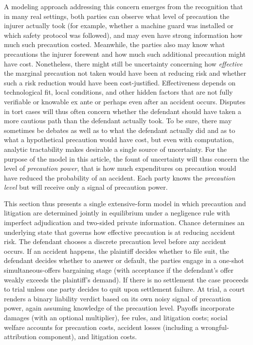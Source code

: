 \documentclass{article}
\begin{document}
A modeling approach addressing this concern emerges from the recognition that in many real settings, both parties can observe what level of precaution the injurer actually took (for example, whether a machine guard was installed or which safety protocol was followed), and may even have strong information how much such precaution costed. Meanwhile, the parties also may know what precautions the injurer forewent and how much such additional precaution might have cost. Nonetheless, there might still be uncertainty concerning how \emph{effective} the marginal precaution not taken would have been at reducing risk and whether such a risk reduction would have been cost-justified. Effectiveness depends on technological fit, local conditions, and other hidden factors that are not fully verifiable or knowable ex ante or perhaps even after an accident occurs. Disputes in tort cases will thus often concern whether the defendant should have taken a more cautious path than the defendant actually took. To be sure, there may sometimes be debates as well as to what the defendant actually did and as to what a hypothetical precaution would have cost, but even with computation, analytic tractability makes desirable a single source of uncertainty. For the purpose of the model in this article, the fount of uncertainty will thus concern the level of \emph{precaution power}, that is how much expenditures on precaution would have reduced the probability of an accident. Each party knows the \emph{precaution level} but will receive only a signal of precaution power. 

This section thus presents a single extensive-form model in which precaution and litigation are determined jointly in equilibrium under a negligence rule with imperfect adjudication and two-sided private information. Chance determines an underlying state that governs how effective precaution is at reducing accident risk. The defendant chooses a discrete precaution level before any accident occurs. If an accident happens, the plaintiff decides whether to file suit, the defendant decides whether to answer or default, the parties engage in a one-shot simultaneous-offers bargaining stage (with acceptance if the defendant’s offer weakly exceeds the plaintiff’s demand). If there is no settlement the case proceeds to trial unless one party decides to quit upon settlement failure. At trial, a court renders a binary liability verdict based on its own noisy signal of precaution power, again assuming knowledge of the precaution level. Payoffs incorporate damages (with an optional multiplier), fee rules, and litigation costs; social welfare accounts for precaution costs, accident losses (including a wrongful-attribution component), and litigation costs. 
\end{document}
